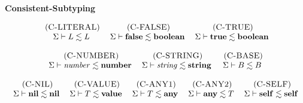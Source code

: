 \begin{figure}[!ht]
\textbf{Consistent-Subtyping}\\
\dstart
\begin{footnotesize}
$$
\begin{array}{c}
\begin{array}{c}
\mylabel{C-LITERAL}\\
\senv \vdash L \lesssim L
\end{array}
\;
\begin{array}{c}
\mylabel{C-FALSE}\\
\senv \vdash \False \lesssim \Boolean
\end{array}
\;
\begin{array}{c}
\mylabel{C-TRUE}\\
\senv \vdash \True \lesssim \Boolean
\end{array}
\\ \\
\begin{array}{c}
\mylabel{C-NUMBER}\\
\senv \vdash {\it number} \lesssim \Number
\end{array}
\;
\begin{array}{c}
\mylabel{C-STRING}\\
\senv \vdash {\it string} \lesssim \String
\end{array}
\;
\begin{array}{c}
\mylabel{C-BASE}\\
\senv \vdash B \lesssim B
\end{array}
\\ \\
\begin{array}{c}
\mylabel{C-NIL}\\
\senv \vdash \Nil \lesssim \Nil
\end{array}
\;
\begin{array}{c}
\mylabel{C-VALUE}\\
\senv \vdash T \lesssim \Value
\end{array}
\;
\begin{array}{c}
\mylabel{C-ANY1}\\
\senv \vdash T \lesssim \Any
\end{array}
\;
\begin{array}{c}
\mylabel{C-ANY2}\\
\senv \vdash \Any \lesssim T
\end{array}
\;
\begin{array}{c}
\mylabel{C-SELF}\\
\senv \vdash \Self \lesssim \Self

\end{array}
\end{array}$$
\end{footnotesize}
\end{figure}
